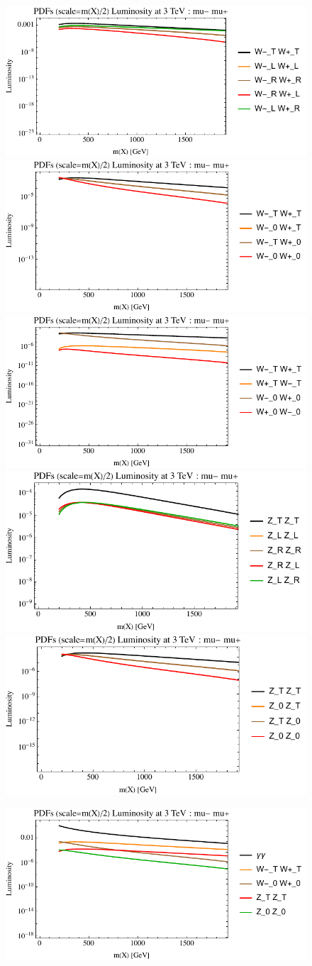 \documentclass[a4paper,11pt]{article}
\begin{document}
\begin{figure}[ht]
\includegraphics[width=0.4\linewidth]{PlotLumi/3TeV/lumis/plotWWpolRandL.pdf}
\includegraphics[width=0.4\linewidth]{PlotLumi/3TeV/lumis/plotWWpolTand0.pdf}
\includegraphics[width=0.4\linewidth]{PlotLumi/3TeV/lumis/plotWmWpandWpWm.pdf}
\includegraphics[width=0.4\linewidth]{PlotLumi/3TeV/lumis/plotZZpolRandL.pdf}
\includegraphics[width=0.4\linewidth]{PlotLumi/3TeV/lumis/plotZZpolTand0.pdf}
\end{figure}

\begin{figure}
\includegraphics[width=0.4\linewidth]{PlotLumi/3TeV/lumis/plotgammaWZ.pdf}
\end{figure}
\end{document}
